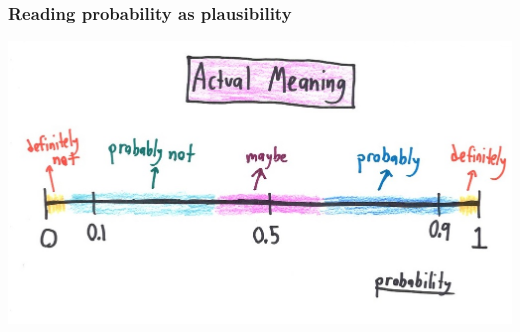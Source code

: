 \documentclass{beamer}
\begin{document}
\begin{frame}
  \frametitle{Reading probability as plausibility}
  \begin{center}
    \includegraphics[width = \textwidth,height = 0.8\textheight,keepaspectratio = true]{figure/probability}
  \end{center}

  \tiny{}
\end{frame} %
\end{document}
